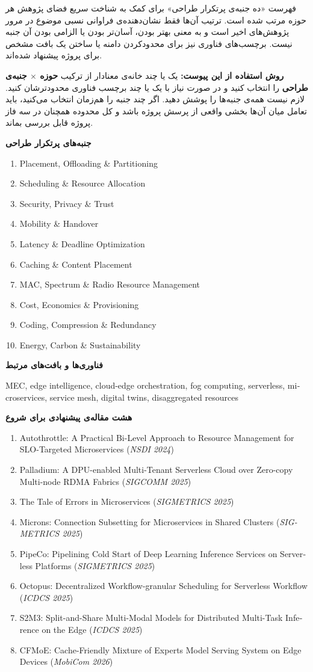 \documentclass[12pt]{article}
\newcommand{\projectarea}[4]{%
\clearpage
\begin{tcolorbox}[
    colback=black!2,
    colframe=black!40,
    boxrule=0.5pt,
    arc=1mm,
    left=3mm,right=3mm,top=2mm,bottom=2mm,
    before skip=8pt,after skip=8pt
]
\linespread{1.08}\selectfont
\begin{latin}
\noindent{\large\bfseries #1}\par
\end{latin}
\smallskip
\textbf{جنبه‌های پرتکرار طراحی}\par
\vspace{1mm}
\begin{latin}
\small\raggedright
\begin{enumerate}[leftmargin=*,nosep,label=\arabic*.]
#2
\end{enumerate}
\end{latin}
\smallskip
\textbf{فناوری‌ها و بافت‌های مرتبط}\par
\begin{latin}
\small\raggedright #3\par
\end{latin}
\smallskip
\textbf{هشت مقاله‌ی پیشنهادی برای شروع}\par
\begin{latin}
\small\raggedright
\begin{enumerate}[leftmargin=*,nosep,label=\arabic*.]
#4
\end{enumerate}
\end{latin}
\end{tcolorbox}
}
\begin{document}
فهرست «ده جنبه‌ی پرتکرار طراحی» برای کمک به شناخت سریع فضای پژوهش هر حوزه مرتب شده است. ترتیب آن‌ها فقط نشان‌دهنده‌ی فراوانی نسبی موضوع در مرور پژوهش‌های اخیر است و به معنی بهتر بودن، آسان‌تر بودن یا الزامی بودن آن جنبه نیست. برچسب‌های فناوری نیز برای محدودکردن دامنه یا ساختن یک بافت مشخص برای پروژه پیشنهاد شده‌اند.

\begin{tcolorbox}[
    colback=black!3,
    colframe=black!50,
    boxrule=0.6pt,
    arc=1.2mm,
    left=2.5mm,right=2.5mm,top=2mm,bottom=2mm
]
\textbf{روش استفاده از این پیوست:}
یک یا چند خانه‌ی معنادار از ترکیب \textbf{حوزه $\times$ جنبه‌ی طراحی} را انتخاب کنید و در صورت نیاز با یک یا چند برچسب فناوری محدودترشان کنید. لازم نیست همه‌ی جنبه‌ها را پوشش دهید. اگر چند جنبه را هم‌زمان انتخاب می‌کنید، باید تعامل میان آن‌ها بخشی واقعی از پرسش پروژه باشد و کل محدوده همچنان در سه فاز پروژه قابل بررسی بماند.
\end{tcolorbox}



\projectarea{Edge, Cloud \& Networked Services}{
    \item Placement, Offloading \& Partitioning
    \item Scheduling \& Resource Allocation
    \item Security, Privacy \& Trust
    \item Mobility \& Handover
    \item Latency \& Deadline Optimization
    \item Caching \& Content Placement
    \item MAC, Spectrum \& Radio Resource Management
    \item Cost, Economics \& Provisioning
    \item Coding, Compression \& Redundancy
    \item Energy, Carbon \& Sustainability
}{MEC, edge intelligence, cloud-edge orchestration, fog computing, serverless, microservices, service mesh, digital twins, disaggregated resources}{
\item Autothrottle: A Practical Bi-Level Approach to Resource Management for SLO-Targeted Microservices (\textit{NSDI 2024})
\item Palladium: A DPU-enabled Multi-Tenant Serverless Cloud over Zero-copy Multi-node RDMA Fabrics (\textit{SIGCOMM 2025})
\item The Tale of Errors in Microservices (\textit{SIGMETRICS 2025})
\item Microns: Connection Subsetting for Microservices in Shared Clusters (\textit{SIGMETRICS 2025})
\item PipeCo: Pipelining Cold Start of Deep Learning Inference Services on Serverless Platforms (\textit{SIGMETRICS 2025})
\item Octopus: Decentralized Workflow-granular Scheduling for Serverless Workflow (\textit{ICDCS 2025})
\item S2M3: Split-and-Share Multi-Modal Models for Distributed Multi-Task Inference on the Edge (\textit{ICDCS 2025})
\item CFMoE: Cache-Friendly Mixture of Experts Model Serving System on Edge Devices (\textit{MobiCom 2026})
}
\end{document}
